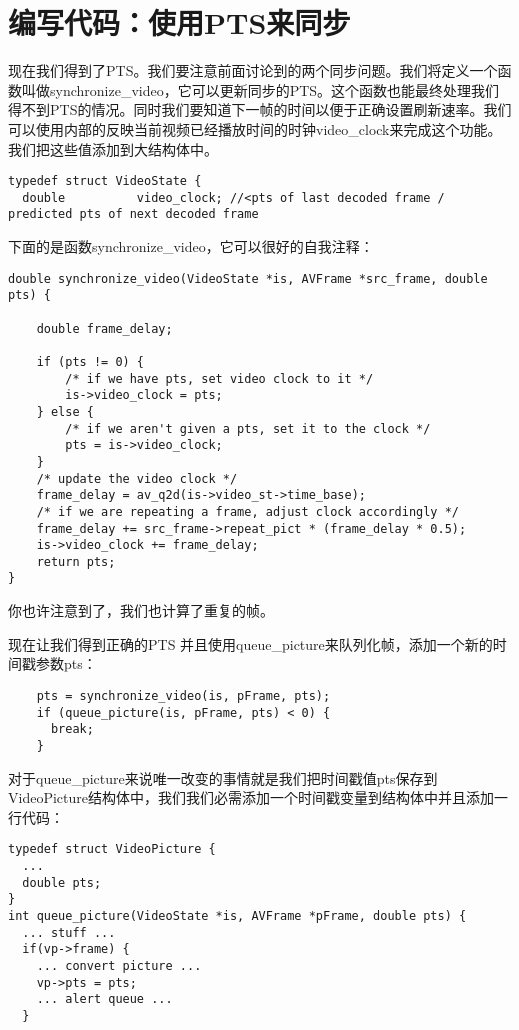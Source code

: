 \section{编写代码：使用PTS来同步}

现在我们得到了PTS。我们要注意前面讨论到的两个同步问题。我们将定义一个函数叫做synchronize_video，它可以更新同步的PTS。这个函数也能最终处理我们得不到PTS的情况。同时我们要知道下一帧的时间以便于正确设置刷新速率。我们可以使用内部的反映当前视频已经播放时间的时钟video_clock来完成这个功能。我们把这些值添加到大结构体中。

 \begin{lstlisting}
typedef struct VideoState {
  double          video_clock; //<pts of last decoded frame / predicted pts of next decoded frame
\end{lstlisting}

下面的是函数synchronize_video，它可以很好的自我注释：

\begin{lstlisting}
double synchronize_video(VideoState *is, AVFrame *src_frame, double pts) {

    double frame_delay;

    if (pts != 0) {
        /* if we have pts, set video clock to it */
        is->video_clock = pts;
    } else {
        /* if we aren't given a pts, set it to the clock */
        pts = is->video_clock;
    }
    /* update the video clock */
    frame_delay = av_q2d(is->video_st->time_base);
    /* if we are repeating a frame, adjust clock accordingly */
    frame_delay += src_frame->repeat_pict * (frame_delay * 0.5);
    is->video_clock += frame_delay;
    return pts;
}
\end{lstlisting}

你也许注意到了，我们也计算了重复的帧。

现在让我们得到正确的PTS 并且使用queue_picture来队列化帧，添加一个新的时间戳参数pts：

\begin{lstlisting}
    pts = synchronize_video(is, pFrame, pts);
    if (queue_picture(is, pFrame, pts) < 0) {
      break;
    }
\end{lstlisting}

对于queue_picture来说唯一改变的事情就是我们把时间戳值pts保存到VideoPicture结构体中，我们我们必需添加一个时间戳变量到结构体中并且添加一行代码：

\begin{lstlisting}
typedef struct VideoPicture {
  ...
  double pts;
}
int queue_picture(VideoState *is, AVFrame *pFrame, double pts) {
  ... stuff ...
  if(vp->frame) {
    ... convert picture ...
    vp->pts = pts;
    ... alert queue ...
  }
\end{lstlisting}

